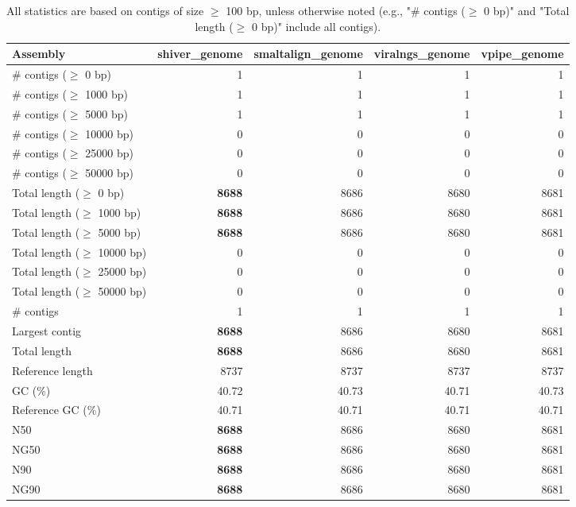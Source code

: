 \documentclass[12pt,a4paper]{article}
\begin{document}
\begin{table}[ht]
\begin{center}
\caption{All statistics are based on contigs of size $\geq$ 100 bp, unless otherwise noted (e.g., "\# contigs ($\geq$ 0 bp)" and "Total length ($\geq$ 0 bp)" include all contigs).}
\begin{tabular}{|l*{4}{|r}|}
\hline
Assembly & shiver\_genome & smaltalign\_genome & viralngs\_genome & vpipe\_genome \\ \hline
\# contigs ($\geq$ 0 bp) & 1 & 1 & 1 & 1 \\ \hline
\# contigs ($\geq$ 1000 bp) & 1 & 1 & 1 & 1 \\ \hline
\# contigs ($\geq$ 5000 bp) & 1 & 1 & 1 & 1 \\ \hline
\# contigs ($\geq$ 10000 bp) & 0 & 0 & 0 & 0 \\ \hline
\# contigs ($\geq$ 25000 bp) & 0 & 0 & 0 & 0 \\ \hline
\# contigs ($\geq$ 50000 bp) & 0 & 0 & 0 & 0 \\ \hline
Total length ($\geq$ 0 bp) & {\bf 8688} & 8686 & 8680 & 8681 \\ \hline
Total length ($\geq$ 1000 bp) & {\bf 8688} & 8686 & 8680 & 8681 \\ \hline
Total length ($\geq$ 5000 bp) & {\bf 8688} & 8686 & 8680 & 8681 \\ \hline
Total length ($\geq$ 10000 bp) & 0 & 0 & 0 & 0 \\ \hline
Total length ($\geq$ 25000 bp) & 0 & 0 & 0 & 0 \\ \hline
Total length ($\geq$ 50000 bp) & 0 & 0 & 0 & 0 \\ \hline
\# contigs & 1 & 1 & 1 & 1 \\ \hline
Largest contig & {\bf 8688} & 8686 & 8680 & 8681 \\ \hline
Total length & {\bf 8688} & 8686 & 8680 & 8681 \\ \hline
Reference length & 8737 & 8737 & 8737 & 8737 \\ \hline
GC (\%) & 40.72 & 40.73 & 40.71 & 40.73 \\ \hline
Reference GC (\%) & 40.71 & 40.71 & 40.71 & 40.71 \\ \hline
N50 & {\bf 8688} & 8686 & 8680 & 8681 \\ \hline
NG50 & {\bf 8688} & 8686 & 8680 & 8681 \\ \hline
N90 & {\bf 8688} & 8686 & 8680 & 8681 \\ \hline
NG90 & {\bf 8688} & 8686 & 8680 & 8681 \\ \hline

\end{tabular}
\end{center}
\end{table}
\end{document}

